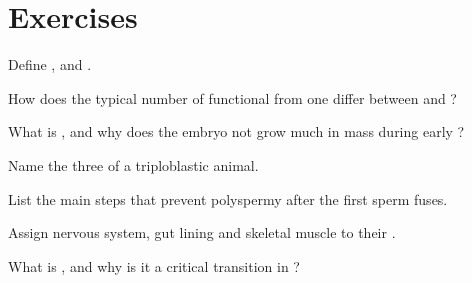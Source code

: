 \section{Exercises}

\begin{exercise}[$\star$]\label{exo:g12:reproduction-development:1}
Define ,  and .
\end{exercise}

\begin{exercise}[$\star$]\label{exo:g12:reproduction-development:2}
How does the typical number of functional  from one 
differ between  and ?
\end{exercise}

\begin{exercise}[$\star$]\label{exo:g12:reproduction-development:3}
What is , and why does the embryo not grow much in mass during
early ?
\end{exercise}

\begin{exercise}[$\star$]\label{exo:g12:reproduction-development:4}
Name the three  of a triploblastic animal.
\end{exercise}

\begin{exercise}[$\star\star$]\label{exo:g12:reproduction-development:5}
List the main steps that prevent polyspermy after the first sperm fuses.
\end{exercise}

\begin{exercise}[$\star\star$]\label{exo:g12:reproduction-development:6}
Assign nervous system, gut lining and skeletal muscle to their .
\end{exercise}

\begin{exercise}[$\star\star$]\label{exo:g12:reproduction-development:7}
What is , and why is it a critical transition in ?
\end{exercise}

